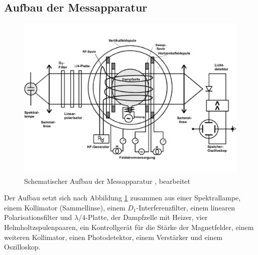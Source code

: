 \subsection{Aufbau der Messapparatur}
%
%
\begin{figure}[h!]
  \centering
  \includegraphics[width=\textwidth]{aufbau.pdf}
  \caption{Schematischer Aufbau der Messapparatur \cite{1}, bearbeitet}
  \label{fig:aufbau}
\end{figure}
Der Aufbau setzt sich nach Abbildung \ref{fig:aufbau} zusammen aus einer Spektrallampe, einem Kollimator (Sammellinse), einem $D_{1}$-Interferenzfilter, einem linearen Polarisationsfilter und $\lambda/4$-Platte, der Dampfzelle mit Heizer, vier Helmholtzspulenpaaren, ein Kontrollgerät für die Stärke der Magnetfelder, einem weiteren Kollimator, einen Photodetektor, einem Verstärker und einem Oszilloskop.
